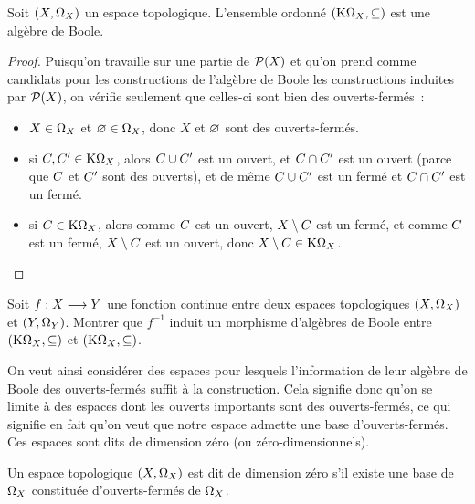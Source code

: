 \begin{property}
  Soit $(X,\Omega_{X})$ un espace topologique. L'ensemble ordonné
  $(\mathrm{K}\Omega_{X},\subseteq)$ est une algèbre de Boole.
\end{property}

\begin{proof}
  Puisqu'on travaille sur une partie de $\mathcal{P}(X)$ et qu'on prend comme
  candidats pour les constructions de l'algèbre de Boole les constructions
  induites par $\mathcal{P}(X)$, on vérifie seulement que celles-ci sont bien
  des ouverts-fermés~:
  \begin{itemize}
  \item $X\in\Omega_{X}$ et $\varnothing\in\Omega_{X}$, donc $X$ et $\varnothing$
    sont des ouverts-fermés.
  \item si $C,C'\in \mathrm{K}\Omega_{X}$, alors $C\cup C'$
    est un ouvert, et $C\cap C'$
    est un ouvert (parce que $C$ et $C'$ sont des ouverts), et de même
    $C\cup C'$ est un fermé et $C\cap C'$ est un fermé.
  \item si $C\in \mathrm{K}\Omega_{X}$, alors comme $C$ est un ouvert,
    $X\setminus C$ est un fermé, et comme $C$ est un fermé,
    $X\setminus C$ est un ouvert, donc
    $X\setminus C \in \mathrm{K}\Omega_{X}$.
  \end{itemize}
\end{proof}

\begin{exercise}
  Soit $f : \displaystyle X \longrightarrow Y$ une fonction continue entre deux espaces
  topologiques $(X,\Omega_{X})$ et $(Y,\Omega_{Y})$. Montrer que $f^{-1}$ induit
  un morphisme d'algèbres de Boole entre $(\mathrm{K}\Omega_{X},\subseteq)$ et
  $(\mathrm{K}\Omega_{X},\subseteq)$.
\end{exercise}

On veut ainsi considérer des espaces pour lesquels l'information de leur algèbre
de Boole des ouverts-fermés suffit à la construction. Cela signifie donc qu'on
se limite à des espaces dont les ouverts \og importants\fg{} sont des
ouverts-fermés, ce qui signifie en fait qu'on veut que notre espace admette une
base d'ouverts-fermés. Ces espaces sont dits de dimension zéro
(ou zéro-dimensionnels).

\begin{definition}
  Un espace topologique $(X,\Omega_{X})$ est dit de dimension zéro s'il existe
  une base de $\Omega_{X}$ constituée d'ouverts-fermés de $\Omega_{X}$.
\end{definition}

